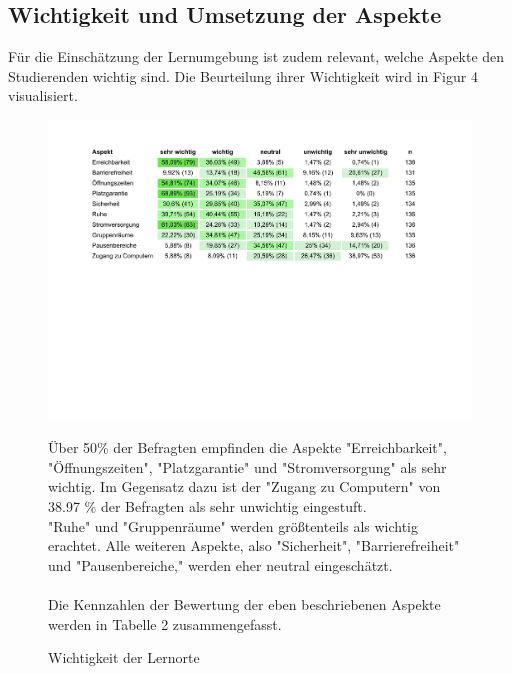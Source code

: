 \documentclass[11pt, a4paper]{article}
\begin{document}
\subsection{Wichtigkeit und Umsetzung der Aspekte}
Für die Einschätzung der Lernumgebung ist zudem relevant, welche Aspekte den Studierenden wichtig sind. Die Beurteilung ihrer Wichtigkeit wird in Figur 4 visualisiert. %
\begin{figure}[htbp]
	\vspace*{6.2cm}
	\hspace*{-1.95cm}
	\includegraphics[scale = 0.746, trim=0.5cm 11cm 0.5cm 11cm]{Tabellen.pdf}
	\caption{Wichtigkeit der Lernorte}
	\vspace{0.5cm}
    Über 50\% der Befragten empfinden die Aspekte "Erreichbarkeit", "Öffnungszeiten", "Platzgarantie" und "Stromversorgung" als sehr wichtig. Im Gegensatz dazu ist der "Zugang zu Computern"  von 38.97 \% der Befragten als sehr unwichtig eingestuft.\\
	"Ruhe" und "Gruppenräume" werden größtenteils als wichtig erachtet. %
	Alle weiteren Aspekte, also "Sicherheit", "Barrierefreiheit" und "Pausenbereiche," werden eher neutral eingeschätzt.\\\\
	Die Kennzahlen der Bewertung der eben beschriebenen Aspekte werden in Tabelle 2 zusammengefasst.
\end{figure}
\end{document}
